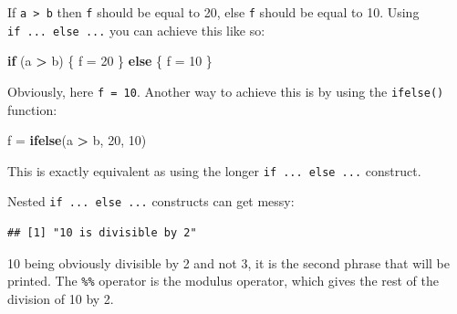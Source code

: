 \documentclass[]{gitbook}
\newenvironment{Shaded}{\begin{snugshade}}{\end{snugshade}}
\newcommand{\ControlFlowTok}[1]{\textcolor[rgb]{0.13,0.29,0.53}{\textbf{#1}}}
\newcommand{\DecValTok}[1]{\textcolor[rgb]{0.00,0.00,0.81}{#1}}
\newcommand{\KeywordTok}[1]{\textcolor[rgb]{0.13,0.29,0.53}{\textbf{#1}}}
\newcommand{\NormalTok}[1]{#1}
\newcommand{\OperatorTok}[1]{\textcolor[rgb]{0.81,0.36,0.00}{\textbf{#1}}}
\newcommand{\StringTok}[1]{\textcolor[rgb]{0.31,0.60,0.02}{#1}}
\theoremstyle{definition}
\theoremstyle{definition}
\theoremstyle{definition}
\theoremstyle{remark}
\begin{document}
If \texttt{a\ \textgreater{}\ b} then \texttt{f} should be equal to 20,
else \texttt{f} should be equal to 10. Using \texttt{if\ ...\ else\ ...}
you can achieve this like so:

\begin{Shaded}
\begin{Highlighting}[]
\ControlFlowTok{if}\NormalTok{ (a }\OperatorTok{>}\StringTok{ }\NormalTok{b) \{}
\NormalTok{  f =}\StringTok{ }\DecValTok{20}
\NormalTok{    \} }\ControlFlowTok{else}\NormalTok{ \{}
\NormalTok{  f =}\StringTok{ }\DecValTok{10}
\NormalTok{\}}
\end{Highlighting}
\end{Shaded}

Obviously, here \texttt{f\ =\ 10}. Another way to achieve this is by
using the \texttt{ifelse()} function:

\begin{Shaded}
\begin{Highlighting}[]
\NormalTok{f =}\StringTok{ }\KeywordTok{ifelse}\NormalTok{(a }\OperatorTok{>}\StringTok{ }\NormalTok{b, }\DecValTok{20}\NormalTok{, }\DecValTok{10}\NormalTok{)}
\end{Highlighting}
\end{Shaded}

This is exactly equivalent as using the longer
\texttt{if\ ...\ else\ ...} construct.

Nested \texttt{if\ ...\ else\ ...} constructs can get messy:

\begin{Shaded}
\end{Shaded}

\begin{verbatim}
## [1] "10 is divisible by 2"
\end{verbatim}

10 being obviously divisible by 2 and not 3, it is the second phrase
that will be printed. The \texttt{\%\%} operator is the modulus
operator, which gives the rest of the division of 10 by 2.
\end{document}
